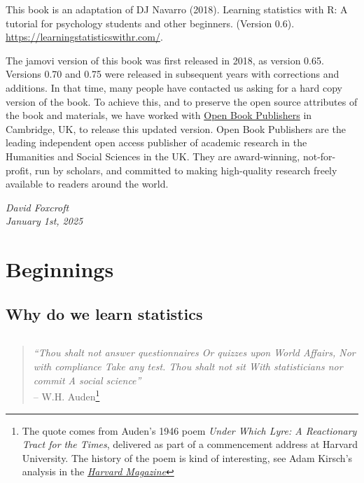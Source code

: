 \documentclass[
  a4paper,
]{book}
\begin{document}

This book is an adaptation of DJ Navarro (2018). Learning statistics
with R: A tutorial for psychology students and other beginners. (Version
0.6). \url{https://learningstatisticswithr.com/}.

The jamovi version of this book was first released in 2018, as version
0.65. Versions 0.70 and 0.75 were released in subsequent years with
corrections and additions. In that time, many people have contacted us
asking for a hard copy version of the book. To achieve this, and to
preserve the open source attributes of the book and materials, we have
worked with
\href{https://www.openbookpublishers.com/books/10.11647/obp.0333}{Open
Book Publishers} in Cambridge, UK, to release this updated version. Open
Book Publishers are the leading independent open access publisher of
academic research in the Humanities and Social Sciences in the UK. They
are award-winning, not-for-profit, run by scholars, and committed to
making high-quality research freely available to readers around the
world.

\emph{David Foxcroft\\
January 1st, 2025}

\part{Beginnings}

\hypertarget{why-do-we-learn-statistics}{%
\chapter{Why do we learn statistics}\label{why-do-we-learn-statistics}}

\[ \]

\begin{quote}
\emph{``Thou shalt not answer questionnaires\emph{\hfill\break
}Or quizzes upon World Affairs,\emph{\hfill\break
}Nor with compliance\emph{\hfill\break
}Take any test. Thou shalt not sit\emph{\hfill\break
}With statisticians nor commit\emph{\hfill\break
}A social science''}\\
-- W.H. Auden\footnote{The quote comes from Auden's 1946 poem
  \emph{Under Which Lyre: A Reactionary Tract for the Times}, delivered
  as part of a commencement address at Harvard University. The history
  of the poem is kind of interesting, see Adam Kirsch's analysis in the
  \emph{\href{https://www.harvardmagazine.com/2007/11/a-poets-warning.html}{Harvard
  Magazine}}}
\end{quote}
\end{document}
